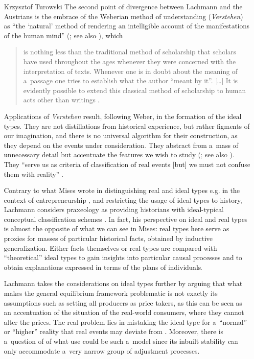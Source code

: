 \begin{artengenv}{Krzysztof Turowski}
The second point of divergence between Lachmann and the Austrians is the embrace of the Weberian method of understanding (\emph{Verstehen}) as ``the `natural' method of rendering an intelligible account of the manifestations of the human mind'' (\cite[17--18]{lachmann-weber}; see also \cite[47]{lachmann-significance}), which
\begin{quote}
is nothing less than the traditional method of scholarship that scholars have used throughout the ages whenever they were concerned with the interpretation of texts. Whenever one is in doubt about the meaning of a~passage one tries to establish what the author ``meant by it''.
[\ldots] It is evidently possible to extend this classical method of scholarship to human acts other than writings \parencite[10]{lachmann-weber}.
\end{quote}

Applications of \emph{Verstehen} result, following Weber, in the formation of the ideal types.
They are not distillations from historical experience, but rather figments of our imagination, and there is no universal algorithm for their construction, as they depend on the events under consideration.
They abstract from a~mass of unnecessary detail but accentuate the features we wish to study (\cite[26--27]{lachmann-weber}; see also \cite[90]{weber}). They ``serve us as criteria of classification of real events [but] we must not confuse them with reality'' \parencite[254]{lachmann-legislation}.

Contrary to what Mises wrote in distinguishing real and ideal types e.g. in the context of entrepreneurship \parencite[59--64, 252--256]{mises-ha}, and restricting the usage of ideal types to history, Lachmann considers praxeology as providing historians with ideal-typical conceptual classification schemes \parencite[34--35]{lachmann1986market}.
In fact, his perspective on ideal and real types is almost the opposite of what we can see in Mises: real types here serve as proxies for masses of particular historical facts, obtained by inductive generalization. Either facts themselves or real types are compared with ``theoretical'' ideal types to gain insights into particular causal processes and to obtain explanations expressed in terms of the plans of individuals.

Lachmann takes the considerations on ideal types further by arguing that what makes the general equilibrium framework problematic is not exactly its assumptions such as setting all producers as price takers, as this can be seen as an accentuation of the situation of the real-world consumers, where they cannot alter the prices.
The real problem lies in mistaking the ideal type for a~``normal'' or ``higher'' reality that real events may deviate from \parencite[37]{lachmann1986market}. Moreover, there is a~question of of what use could be such a~model since its inbuilt stability can only accommodate a~very narrow group of adjustment processes.


\end{artengenv}
